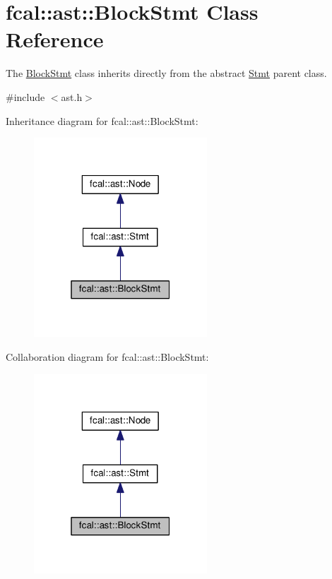 \hypertarget{classfcal_1_1ast_1_1BlockStmt}{}\section{fcal\+:\+:ast\+:\+:Block\+Stmt Class Reference}
\label{classfcal_1_1ast_1_1BlockStmt}


The \hyperlink{classfcal_1_1ast_1_1BlockStmt}{Block\+Stmt} class inherits directly from the abstract \hyperlink{classfcal_1_1ast_1_1Stmt}{Stmt} parent class.  




{\ttfamily \#include $<$ast.\+h$>$}



Inheritance diagram for fcal\+:\+:ast\+:\+:Block\+Stmt\+:\nopagebreak
\begin{figure}[H]
\begin{center}
\leavevmode
\includegraphics[width=184pt]{classfcal_1_1ast_1_1BlockStmt__inherit__graph}
\end{center}
\end{figure}


Collaboration diagram for fcal\+:\+:ast\+:\+:Block\+Stmt\+:\nopagebreak
\begin{figure}[H]
\begin{center}
\leavevmode
\includegraphics[width=184pt]{classfcal_1_1ast_1_1BlockStmt__coll__graph}
\end{center}
\end{figure}
